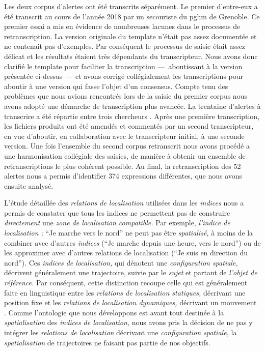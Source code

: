 Les deux corpus d'alertes ont été transcrits séparément. Le premier
d'entre-eux a été transcrit au cours de l'année 2018 par un secouriste
du \ac{pghm} de Grenoble. Ce premier essai a mis en évidence de
nombreuses lacunes dans le processus de retranscription. La version
originale du template n'était pas assez documentée et ne contenait pas
d'exemples. Par conséquent le processus de saisie était assez délicat
et les résultats étaient très dépendants du transcripteur. Nous avons
donc clarifié le template pour faciliter la transcription
---~aboutissant à la version présentée ci-dessus~--- et avons corrigé
collégialement les transcriptions pour aboutir à une version qui fasse
l'objet d'un consensus. Compte tenu des problèmes que nous avions
rencontrés lors de la saisie du premier corpus nous avons adopté une
démarche de transcription plus avancée. La trentaine d'alertes à
transcrire a été répartie entre trois chercheurs
\autocite{Bunel2019}. Après une première transcription, les fichiers
produits ont été amendés et commentés par un second transcripteur, en
vue d'aboutir, en collaboration avec le transcripteur initial, à une
seconde version. Une fois l'ensemble du second corpus retranscrit nous
avons procédé a une harmonisation collégiale des saisies, de manière à
obtenir un ensemble de retranscriptions le plus cohérent possible. Au
final, la retranscription des 52 alertes nous a permis d'identifier
374 expressions différentes, que nous avons ensuite analysé.

L'étude détaillée des \emph{relations de localisation} utilisées dans
les \emph{indices} nous a permis de constater que tous les indices ne
permettent pas de construire \emph{directement} une \emph{zone de
  localisation compatible.} Par exemple, \emph{l'indice de
  localisation :} \enquote{Je marche vers le nord} ne peut pas être
\emph{spatialisé,} à moins de la combiner avec d'autres \emph{indices}
(\eg \enquote{Je marche depuis une heure, vers le nord}) ou de les
approximer avec d'autres relations de localisation (\eg \enquote{Je
  suis en direction du nord}). Ces \emph{indices de localisation,} qui
dénotent une \emph{configuration spatiale,} décrivent généralement une
trajectoire, suivie par le \emph{sujet} et partant de \emph{l'objet de
  référence.} Par conséquent, cette distinction recoupe celle qui est
généralement faite en linguistique entre les \emph{relations de
  localisation statiques,} décrivant une position fixe et les
\emph{relations de localisation dynamiques,} décrivant un mouvement
\autocite{Borillo1998}. Comme l'ontologie que nous développons est
avant tout destinée à la \emph{spatialisation} des \emph{indices de
  localisation,} nous avons pris la décision de ne pas y intégrer les
\emph{relations de localisation} décrivant une \emph{configuration
  spatiale,} la \emph{spatialisation} de trajectoires ne faisant pas
partie de nos objectifs.


